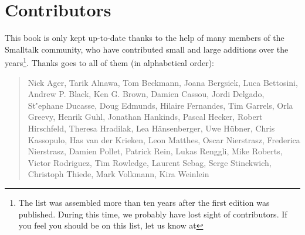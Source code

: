 \chapter*{Contributors}
This book is only kept up-to-date thanks to the help of many members of the Smalltalk community, who have contributed small and large additions over the years\footnote{The list was assembled more than ten years after the first edition was published. During this time, we probably have lost sight of contributors. If you feel you should be on this list, let us know at \sbeRepoUrl}. Thanks goes to all of them (in alphabetical order):


\begin{quotation}
Nick Ager, Tarik Alnawa, Tom Beckmann, Joana Bergsiek, Luca Bettosini, Andrew P. Black, Ken G. Brown, Damien Cassou, Jordi Delgado, St\''ephane Ducasse, Doug Edmunds, Hilaire Fernandes, Tim Garrels, Orla Greevy, Henrik Guhl, Jonathan Hankinds, Pascal Hecker, Robert Hirschfeld, Theresa Hradilak, Lea H\"ansenberger, Uwe H\"ubner, Chris Kassopulo, Has van der Krieken, Leon Matthes, Oscar Nierstrasz, Frederica Nierstrasz, Damien Pollet, Patrick Rein, Lukas Renggli, Mike Roberts, Victor Rodriguez, Tim Rowledge, Laurent Sebag, Serge Stinckwich, Christoph Thiede, Mark Volkmann, Kira Weinlein
\end{quotation}

%
%
